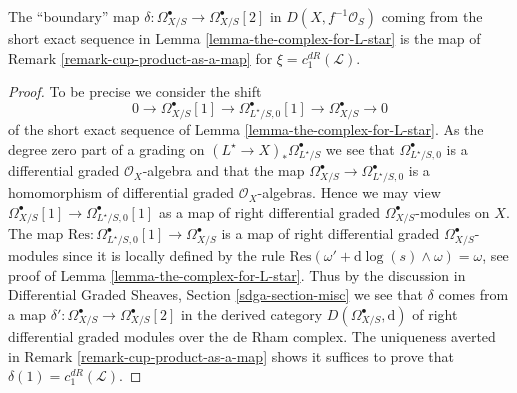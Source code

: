 \begin{lemma}
\label{lemma-the-complex-for-L-star-gives-chern-class}
The ``boundary'' map
$\delta : \Omega^\bullet_{X/S} \to \Omega^\bullet_{X/S}[2]$
in $D(X, f^{-1}\mathcal{O}_S)$ coming from
the short exact sequence in Lemma \ref{lemma-the-complex-for-L-star}
is the map of Remark \ref{remark-cup-product-as-a-map}
for $\xi = c_1^{dR}(\mathcal{L})$.
\end{lemma}

\begin{proof}
To be precise we consider the shift
$$
0 \to \Omega^\bullet_{X/S}[1] \to
\Omega^\bullet_{L^\star/S, 0}[1] \to
\Omega^\bullet_{X/S} \to 0
$$
of the short exact sequence of Lemma \ref{lemma-the-complex-for-L-star}.
As the degree zero part of a grading on
$(L^\star \to X)_*\Omega^\bullet_{L^\star/S}$
we see that $\Omega^\bullet_{L^\star/S, 0}$ is a differential
graded $\mathcal{O}_X$-algebra and that the map
$\Omega^\bullet_{X/S} \to \Omega^\bullet_{L^\star/S, 0}$
is a homomorphism of differential graded $\mathcal{O}_X$-algebras.
Hence we may view $\Omega^\bullet_{X/S}[1] \to
\Omega^\bullet_{L^\star/S, 0}[1]$ as a map of right differential graded
$\Omega^\bullet_{X/S}$-modules on $X$. The map
$\text{Res} : \Omega^\bullet_{L^\star/S, 0}[1] \to \Omega^\bullet_{X/S}$
is a map of right differential graded $\Omega^\bullet_{X/S}$-modules
since it is locally defined by the rule
$\text{Res}(\omega' + \text{d}\log(s) \wedge \omega) = \omega$, see
proof of Lemma \ref{lemma-the-complex-for-L-star}.
Thus by the discussion in
Differential Graded Sheaves, Section \ref{sdga-section-misc}
we see that $\delta$ comes from a map
$\delta' : \Omega^\bullet_{X/S} \to \Omega^\bullet_{X/S}[2]$
in the derived category $D(\Omega^\bullet_{X/S}, \text{d})$
of right differential graded modules over the de Rham complex.
The uniqueness averted in Remark \ref{remark-cup-product-as-a-map}
shows it suffices to prove that $\delta(1) = c_1^{dR}(\mathcal{L})$.


\end{proof}
